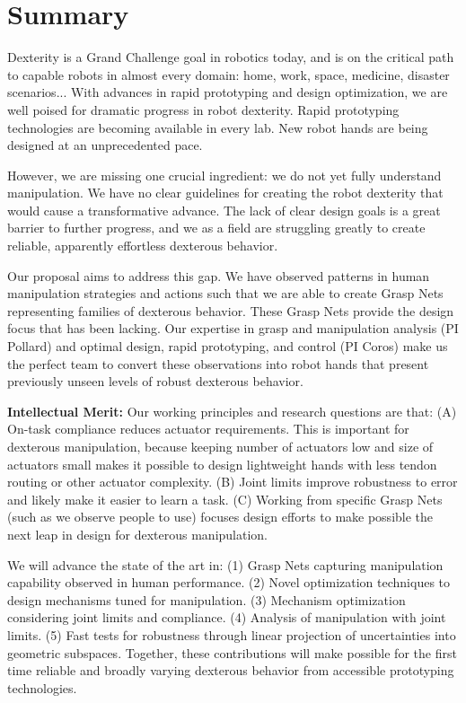 \section{Summary}

Dexterity is a Grand Challenge goal in robotics today, and is on the critical path to capable robots in almost every domain:  home, work, space, medicine, disaster scenarios...    With advances in rapid prototyping and design optimization, we are well poised for dramatic progress in robot dexterity.   Rapid prototyping technologies are becoming available in every lab.    New robot hands are being designed at an unprecedented pace.

However, we are missing one crucial ingredient:  we do not yet fully understand manipulation.   We have no clear guidelines for creating the robot dexterity that would cause a transformative advance.   The lack of clear design goals is a great barrier to further progress, and we as a field are struggling greatly to create reliable, apparently effortless dexterous behavior.

Our proposal aims to address this gap.   We have observed patterns in human manipulation strategies and actions such that we are able to create Grasp Nets representing families of dexterous behavior.    These Grasp Nets provide the design focus that has been lacking.    Our expertise in grasp and manipulation analysis (PI Pollard) and optimal design, rapid prototyping, and control (PI Coros) make us the perfect team to convert these observations  into robot hands that present previously unseen levels of robust dexterous behavior.

{\bf Intellectual Merit:}
Our working principles and research questions are that:
(A) On-task compliance reduces actuator requirements.   This is important for dexterous manipulation, because keeping number of actuators low and size of actuators small makes it possible to design lightweight hands with less tendon routing or other actuator complexity.
(B) Joint limits improve robustness to error and likely make it easier to learn a task.
(C) Working from specific Grasp Nets (such as we observe people to use) focuses design efforts to make possible the next leap in design for dexterous manipulation.

We will advance the state of the art in:
(1) Grasp Nets capturing manipulation capability observed in human performance.
(2) Novel optimization techniques to design mechanisms tuned for manipulation.
(3) Mechanism optimization considering joint limits and compliance.
(4) Analysis of manipulation with joint limits.
(5) Fast tests for robustness through linear projection of uncertainties into geometric subspaces.
Together, these contributions will make possible for the first time reliable and broadly varying dexterous behavior from accessible prototyping technologies.

